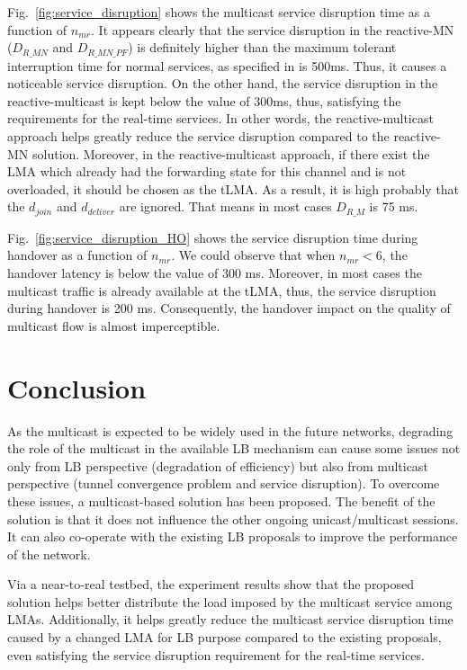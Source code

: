 Fig.~\ref{fig:service_disruption} shows the multicast service disruption time as a function of $n_{mr}$. It appears clearly that the service disruption in the reactive-MN ($D_{R\_MN}$ and $D_{R\_MN\_PF}$) is definitely higher than the maximum tolerant interruption time for normal services, as specified in \cite{interruption_requirements} is 500ms. Thus, it causes a noticeable service disruption. On the other hand, the service disruption in the reactive-multicast is kept below the value of 300ms, thus, satisfying the requirements for the real-time services. In other words, the reactive-multicast approach helps greatly reduce the service disruption compared to the reactive-MN solution. Moreover, in the reactive-multicast approach, if there exist the LMA which already had the forwarding state for this channel and is not overloaded, it should be chosen as the tLMA. As a result, it is high probably that the $d_{join}$ and $d_{deliver}$ are ignored. That means in most cases $D_{R\_M}$ is 75 ms. 

Fig.~\ref{fig:service_disruption_HO} shows the service disruption time during handover as a function of $n_{mr}$. We could observe that when $n_{mr}<6$, the handover latency is below the value of 300 ms. Moreover, in most cases the multicast traffic is already available at the tLMA, thus, the service disruption during handover is 200 ms. Consequently, the handover impact on the quality of multicast flow is almost imperceptible.
\section{Conclusion} \label{ch7:conclusion}
As the multicast is expected to be widely used in the future networks, degrading the role of the multicast in the available LB mechanism can cause some issues not only from LB perspective (degradation of efficiency) but also from multicast perspective (tunnel convergence problem and service disruption).  To overcome these issues, a multicast-based solution has been proposed. The benefit of the solution is that it does not influence the other ongoing unicast/multicast sessions. It can also co-operate with the existing LB proposals to improve the performance of the network.

Via a near-to-real testbed, the experiment results show that the proposed solution helps better distribute the load imposed by the multicast service among LMAs. Additionally, it helps greatly reduce the multicast service disruption time caused by a changed LMA for LB purpose compared to the existing proposals, even satisfying the service disruption requirement for the real-time services.  

